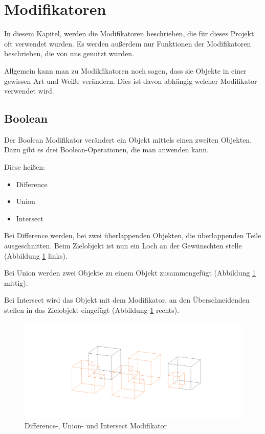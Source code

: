 \section{Modifikatoren}
In diesem Kapitel, werden die Modifikatoren beschrieben, die für dieses Projekt oft verwendet wurden.
Es werden außerdem nur Funktionen der Modifikatoren beschrieben, die von uns genutzt wurden.

Allgemein kann man zu Modikfikatoren noch sagen, dass sie Objekte in einer gewissen Art und Weiße verändern.
Dies ist davon abhängig welcher Modifikator verwendet wird.

\subsection{Boolean}\citep{blender:boolean_modifier}
\label{Boolean:heading}
Der Boolean Modifikator verändert ein Objekt mittels einen zweiten Objekten. Dazu gibt es
drei Boolean-Operationen, die man anwenden kann.

Diese heißen:
\begin{itemize}
    \item  Difference
    \item  Union
    \item  Intersect
\end{itemize}

Bei Difference werden, bei zwei überlappenden Objekten, die überlappenden Teile ausgeschnitten. Beim Zielobjekt ist nun ein Loch an der Gewünschten stelle (Abbildung \ref{modifikatoren:image1} links).

Bei Union werden zwei Objekte zu einem Objekt zusammengefügt (Abbildung \ref{modifikatoren:image1} mittig).

Bei Intersect wird das Objekt mit dem Modifikator, an den Überschneidenden stellen in das Zielobjekt eingefügt (Abbildung \ref{modifikatoren:image1} rechts).

\begin{figure}[h]
    \centering
    \includegraphics[width=.8\textwidth]{images/Modifikatoren-Boolean.png}
    \caption{Difference-, Union- und Intersect Modifikator}
    \label{modifikatoren:image1}
\end{figure}

